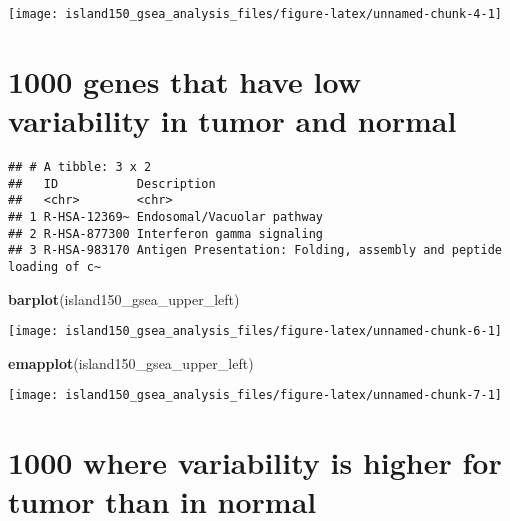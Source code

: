 \documentclass[
]{article}
\newenvironment{Shaded}{\begin{snugshade}}{\end{snugshade}}
\newcommand{\KeywordTok}[1]{\textcolor[rgb]{0.13,0.29,0.53}{\textbf{#1}}}
\newcommand{\NormalTok}[1]{#1}
\newcommand{\OperatorTok}[1]{\textcolor[rgb]{0.81,0.36,0.00}{\textbf{#1}}}
\newcommand{\StringTok}[1]{\textcolor[rgb]{0.31,0.60,0.02}{#1}}
\begin{document}
\texttt{[image: island150\_gsea\_analysis\_files/figure-latex/unnamed-chunk-4-1]}

\hypertarget{genes-that-have-low-variability-in-tumor-and-normal}{%
\section{1000 genes that have low variability in tumor and
normal}\label{genes-that-have-low-variability-in-tumor-and-normal}}

\begin{Shaded}
\end{Shaded}

\begin{verbatim}
## # A tibble: 3 x 2
##   ID           Description                                                      
##   <chr>        <chr>                                                            
## 1 R-HSA-12369~ Endosomal/Vacuolar pathway                                       
## 2 R-HSA-877300 Interferon gamma signaling                                       
## 3 R-HSA-983170 Antigen Presentation: Folding, assembly and peptide loading of c~
\end{verbatim}

\begin{Shaded}
\begin{Highlighting}[]
\KeywordTok{barplot}\NormalTok{(island150_gsea_upper_left)}
\end{Highlighting}
\end{Shaded}

\texttt{[image: island150\_gsea\_analysis\_files/figure-latex/unnamed-chunk-6-1]}

\begin{Shaded}
\begin{Highlighting}[]
\KeywordTok{emapplot}\NormalTok{(island150_gsea_upper_left)}
\end{Highlighting}
\end{Shaded}

\texttt{[image: island150\_gsea\_analysis\_files/figure-latex/unnamed-chunk-7-1]}

\hypertarget{where-variability-is-higher-for-tumor-than-in-normal}{%
\section{1000 where variability is higher for tumor than in
normal}\label{where-variability-is-higher-for-tumor-than-in-normal}}
\end{document}

